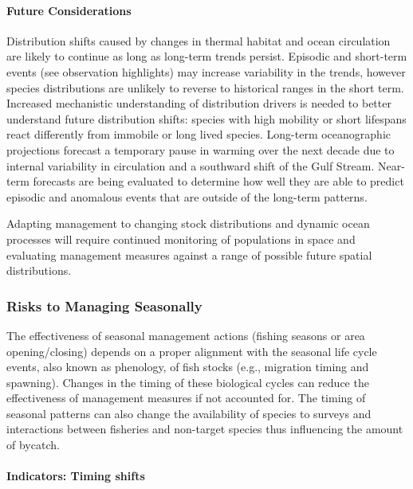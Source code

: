 \documentclass[
  10pt,
]{article}
\begin{document}
\hypertarget{future-considerations}{%
\paragraph{Future Considerations}\label{future-considerations}}

Distribution shifts caused by changes in thermal habitat and ocean circulation are likely to continue as long as long-term trends persist. Episodic and short-term events (see observation highlights) may increase variability in the trends, however species distributions are unlikely to reverse to historical ranges in the short term. Increased mechanistic understanding of distribution drivers is needed to better understand future distribution shifts: species with high mobility or short lifespans react differently from immobile or long lived species.
Long-term oceanographic projections forecast a temporary pause in warming over the next decade due to internal variability in circulation and a southward shift of the Gulf Stream. Near-term forecasts are being evaluated to determine how well they are able to predict episodic and anomalous events that are outside of the long-term patterns.

Adapting management to changing stock distributions and dynamic ocean processes will require continued monitoring of populations in space and evaluating management measures against a range of possible future spatial distributions.

\hypertarget{risks-to-managing-seasonally}{%
\subsubsection{Risks to Managing Seasonally}\label{risks-to-managing-seasonally}}

The effectiveness of seasonal management actions (fishing seasons or area opening/closing) depends on a proper alignment with the seasonal life cycle events, also known as phenology, of fish stocks (e.g., migration timing and spawning). Changes in the timing of these biological cycles can reduce the effectiveness of management measures if not accounted for. The timing of seasonal patterns can also change the availability of species to surveys and interactions between fisheries and non-target species thus influencing the amount of bycatch.

\hypertarget{indicators-timing-shifts}{%
\paragraph{Indicators: Timing shifts}\label{indicators-timing-shifts}}
\end{document}
